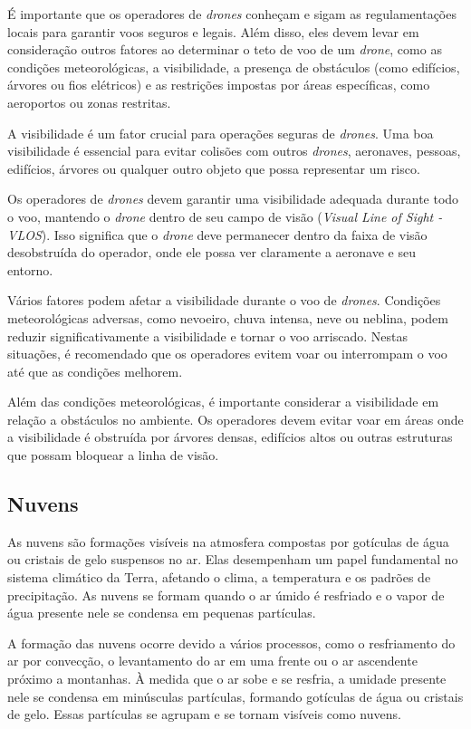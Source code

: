 \documentclass[a4paper, 12pt, onecolumn,singlespacing]{article}
\begin{document}
	É importante que os operadores de \textit{drones} conheçam e sigam as regulamentações locais para garantir voos seguros e legais. Além disso, eles devem levar em consideração outros fatores ao determinar o teto de voo de um \textit{drone}, como as condições meteorológicas, a visibilidade, a presença de obstáculos (como edifícios, árvores ou fios elétricos) e as restrições impostas por áreas específicas, como aeroportos ou zonas restritas.

	A visibilidade é um fator crucial para operações seguras de \textit{drones}. Uma boa visibilidade é essencial para evitar colisões com outros \textit{drones}, aeronaves, pessoas, edifícios, árvores ou qualquer outro objeto que possa representar um risco.
	
	Os operadores de \textit{drones} devem garantir uma visibilidade adequada durante todo o voo, mantendo o \textit{drone} dentro de seu campo de visão (\textit{Visual Line of Sight - VLOS}). Isso significa que o \textit{drone} deve permanecer dentro da faixa de visão desobstruída do operador, onde ele possa ver claramente a aeronave e seu entorno.
	
	Vários fatores podem afetar a visibilidade durante o voo de \textit{drones}. Condições meteorológicas adversas, como nevoeiro, chuva intensa, neve ou neblina, podem reduzir significativamente a visibilidade e tornar o voo arriscado. Nestas situações, é recomendado que os operadores evitem voar ou interrompam o voo até que as condições melhorem.
	
	Além das condições meteorológicas, é importante considerar a visibilidade em relação a obstáculos no ambiente. Os operadores devem evitar voar em áreas onde a visibilidade é obstruída por árvores densas, edifícios altos ou outras estruturas que possam bloquear a linha de visão.
	
	\subsection{Nuvens}
	
	As nuvens são formações visíveis na atmosfera compostas por gotículas de água ou cristais de gelo suspensos no ar. Elas desempenham um papel fundamental no sistema climático da Terra, afetando o clima, a temperatura e os padrões de precipitação. As nuvens se formam quando o ar úmido é resfriado e o vapor de água presente nele se condensa em pequenas partículas.
	
	A formação das nuvens ocorre devido a vários processos, como o resfriamento do ar por convecção, o levantamento do ar em uma frente ou o ar ascendente próximo a montanhas. À medida que o ar sobe e se resfria, a umidade presente nele se condensa em minúsculas partículas, formando gotículas de água ou cristais de gelo. Essas partículas se agrupam e se tornam visíveis como nuvens.
	
\end{document}
